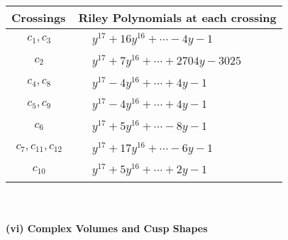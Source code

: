 \documentclass[1p]{elsarticle_modified}
\theoremstyle{definition}
\begin{document}
\begin{tabular}{m{50pt}|m{274pt}}
Crossings & \hspace{64pt}Riley Polynomials at each crossing \\
\hline $$\begin{aligned}c_{1},c_{3}\end{aligned}$$&$\begin{aligned}
&y^{17}+16 y^{16}+\cdots-4 y-1
\end{aligned}$\\
\hline $$\begin{aligned}c_{2}\end{aligned}$$&$\begin{aligned}
&y^{17}+7 y^{16}+\cdots+2704 y-3025
\end{aligned}$\\
\hline $$\begin{aligned}c_{4},c_{8}\end{aligned}$$&$\begin{aligned}
&y^{17}-4 y^{16}+\cdots+4 y-1
\end{aligned}$\\
\hline $$\begin{aligned}c_{5},c_{9}\end{aligned}$$&$\begin{aligned}
&y^{17}-4 y^{16}+\cdots+4 y-1
\end{aligned}$\\
\hline $$\begin{aligned}c_{6}\end{aligned}$$&$\begin{aligned}
&y^{17}+5 y^{16}+\cdots-8 y-1
\end{aligned}$\\
\hline $$\begin{aligned}c_{7},c_{11},c_{12}\end{aligned}$$&$\begin{aligned}
&y^{17}+17 y^{16}+\cdots-6 y-1
\end{aligned}$\\
\hline $$\begin{aligned}c_{10}\end{aligned}$$&$\begin{aligned}
&y^{17}+5 y^{16}+\cdots+2 y-1
\end{aligned}$\\
\hline
\end{tabular}\\~\\
\newpage\flushleft \textbf{(vi) Complex Volumes and Cusp Shapes}
\end{document}
